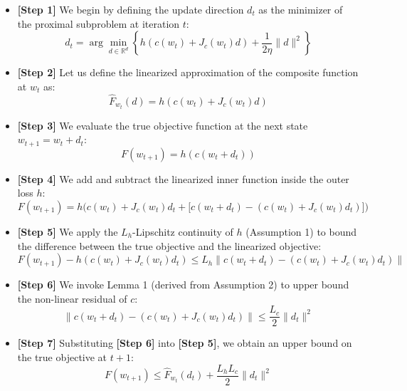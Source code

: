 \documentclass[11pt]{article}
\begin{document}
\begin{itemize}
    \item \textbf{[Step 1]} We begin by defining the update direction $d_t$ as the minimizer of the proximal subproblem at iteration $t$:
    \begin{equation}
        d_t = \arg\min_{d \in \mathbb{R}^d} \left\{ h(c(w_t) + J_c(w_t)d) + \frac{1}{2\eta}\|d\|^2 \right\}
    \end{equation}
    
    \item \textbf{[Step 2]} Let us define the linearized approximation of the composite function at $w_t$ as:
    \begin{equation}
        \hat{F}_{w_t}(d) = h(c(w_t) + J_c(w_t)d)
    \end{equation}
    
    \item \textbf{[Step 3]} We evaluate the true objective function at the next state $w_{t+1} = w_t + d_t$:
    \begin{equation}
        F(w_{t+1}) = h(c(w_t + d_t))
    \end{equation}
    
    \item \textbf{[Step 4]} We add and subtract the linearized inner function inside the outer loss $h$:
    \begin{equation}
        F(w_{t+1}) = h\Big( c(w_t) + J_c(w_t)d_t + \big[ c(w_t + d_t) - (c(w_t) + J_c(w_t)d_t) \big] \Big)
    \end{equation}
    
    \item \textbf{[Step 5]} We apply the $L_h$-Lipschitz continuity of $h$ (Assumption 1) to bound the difference between the true objective and the linearized objective:
    \begin{equation}
        F(w_{t+1}) - h(c(w_t) + J_c(w_t)d_t) \leq L_h \big\| c(w_t + d_t) - (c(w_t) + J_c(w_t)d_t) \big\|
    \end{equation}
    
    \item \textbf{[Step 6]} We invoke Lemma 1 (derived from Assumption 2) to upper bound the non-linear residual of $c$:
    \begin{equation}
        \big\| c(w_t + d_t) - (c(w_t) + J_c(w_t)d_t) \big\| \leq \frac{L_c}{2} \|d_t\|^2
    \end{equation}
    
    \item \textbf{[Step 7]} Substituting \textbf{[Step 6]} into \textbf{[Step 5]}, we obtain an upper bound on the true objective at $t+1$:
    \begin{equation}
        F(w_{t+1}) \leq \hat{F}_{w_t}(d_t) + \frac{L_h L_c}{2} \|d_t\|^2
    \end{equation}
    

\end{itemize}
\end{document}
